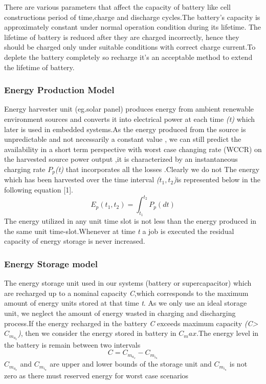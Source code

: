\documentclass[12pt,hidelinks]{article}
\begin{document}
{There are various parameters that affect the capacity of battery like cell constructions period of time,charge and discharge cycles.The battery's capacity is approximately constant under normal operation condition during its lifetime. The lifetime of battery is reduced after they are charged incorrectly, hence they should be charged only under suitable conditions with correct charge current.To deplete the battery completely so recharge it's an acceptable method to extend the lifetime of battery.
\subsubsection{Energy Production Model}
\newline
Energy harvester unit  (eg.solar panel) produces energy from ambient renewable environment sources and converts it into electrical power at each time \textit{(t)} which later is used in embedded systems.As the energy produced from the source is unpredictable and not necessarily a constant value , we can still predict the availability in a short term perspective with worst case changing rate (WCCR) on the harvested source power output ,it is characterized by an instantaneous charging rate $P_p$\textit{(t)} that incorporates all the losses \cite{DPM_1}.Clearly we do not 
The energy which has been harvested over the time interval \textit{($t_1,t_2$)}is represented below in the following equation [1].
\begin{equation}
    E_p(t_1,t_2)=\int_{t_1}^{t_2}P_p (dt)
\end{equation}
The energy utilized in any unit time slot is not less than the energy produced in the same unit time-slot.Whenever at time \textit{t} a job is executed the residual capacity of energy storage is never increased.


\subsubsection{Energy Storage model}
\newline
The energy storage unit used in our systems (battery or supercapacitor) which are recharged up to a nominal capacity \textit{C},which corresponds to the maximum amount of energy units stored at that time \textit{t}. As we only use an ideal storage  unit, we neglect the amount of energy wasted in charging and discharging process.If the energy recharged in the battery \textit{C} exceeds maximum  capacity \textit{(C>$C_m_a_x$)}, then we consider the energy stored in battery in \textit{$C_max$}.The energy level in the battery is remain between two intervals 
\begin{equation}
    C= C_m_a_x-C_m_i_n
\end{equation}
$C_m_a_x$ and $C_m_i_n$ are upper and lower bounds of the storage unit and 
$C_m_i_n $ is not zero as there must reserved energy for worst case scenarios


}
\end{document}
